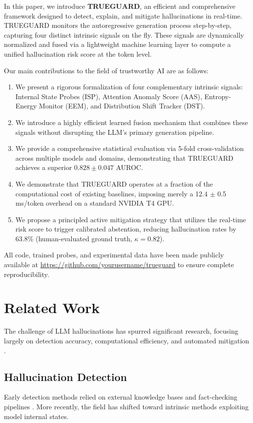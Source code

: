 \documentclass[conference]{IEEEtran}
\begin{document}
In this paper, we introduce \textbf{TRUEGUARD}, an efficient and comprehensive framework designed to detect, explain, and mitigate hallucinations in real-time. TRUEGUARD monitors the autoregressive generation process step-by-step, capturing four distinct intrinsic signals on the fly. These signals are dynamically normalized and fused via a lightweight machine learning layer to compute a unified hallucination risk score at the token level. 

Our main contributions to the field of trustworthy AI are as follows:
\begin{enumerate}
    \item We present a rigorous formalization of four complementary intrinsic signals: Internal State Probes (ISP), Attention Anomaly Score (AAS), Entropy-Energy Monitor (EEM), and Distribution Shift Tracker (DST). 
    \item We introduce a highly efficient learned fusion mechanism that combines these signals without disrupting the LLM's primary generation pipeline.
    \item We provide a comprehensive statistical evaluation via 5-fold cross-validation across multiple models and domains, demonstrating that TRUEGUARD achieves a superior $0.828 \pm 0.047$ AUROC.
    \item We demonstrate that TRUEGUARD operates at a fraction of the computational cost of existing baselines, imposing merely a 12.4 $\pm$ 0.5 ms/token overhead on a standard NVIDIA T4 GPU.
    \item We propose a principled active mitigation strategy that utilizes the real-time risk score to trigger calibrated abstention, reducing hallucination rates by 63.8\% (human-evaluated ground truth, $\kappa=0.82$).
\end{enumerate}
All code, trained probes, and experimental data have been made publicly available at \url{https://github.com/yourusername/trueguard} to ensure complete reproducibility.

\section{Related Work}
The challenge of LLM hallucinations has spurred significant research, focusing largely on detection accuracy, computational efficiency, and automated mitigation \cite{mundler2023self, kang2025uq, herrera2025xai}.

\subsection{Hallucination Detection}
Early detection methods relied on external knowledge bases and fact-checking pipelines \cite{chern2023factool, sriramanan2024llmcheck}. More recently, the field has shifted toward intrinsic methods exploiting model internal states.
\end{document}
